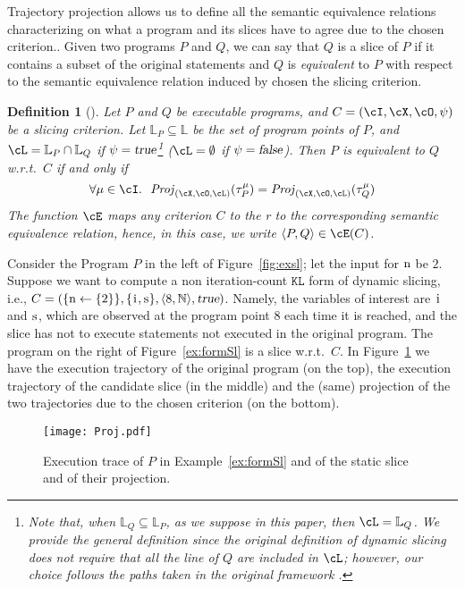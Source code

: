 \documentclass[prodmode,acmtocl]{acmsmall}
\def\prog{\ensuremath{P}\xspace}
\def\progq{\ensuremath{Q}\xspace}
\def\trace{\ensuremath{\tau}\xspace}
\def\memory{\ensuremath{\mu}\xspace}
\def\lnums{\ensuremath{\mathbb{L}}\xspace}
\def\crit{\ensuremath{C}\xspace}
\def\KL{\ensuremath{\mathtt{KL}}\xspace}
\def\Proj{\ensuremath{\mathit{Proj}}\xspace}
\newcommand{\la}{\leftarrow}
\newcommand{\false}{\mbox{\sl false}}
\newcommand{\true}{\mbox{\sl true}}
\def\tuple#1{\langle #1 \rangle}
\newcommand{\0}{\mbox{\bf 0}}
\newtheorem{mydefinition}[theorem]{Definition}
\newcommand{\CODE}[1]{\ensuremath{\mbox{\lstinline!#1!}\xspace}\xspace}
\def\ii{\CODE{i}}
\def\nn{\CODE{n}}
\def\ss{\CODE{s}}
\def\NATURALS{\mathbb{N}}
\begin{document}
Trajectory projection allows us to define all the semantic equivalence
relations characterizing on what a program and its slices have to agree due to the chosen criterion..  Given two programs $\prog$ and
$\progq$, we can say that $\progq$ is a slice of $\prog$ if it contains a subset of the original
statements and $\progq$ is \emph{equivalent} to $\prog$ with respect
to the semantic equivalence relation induced by chosen the slicing criterion.

\begin{mydefinition}[\cite{AForm}]
  \label{def:UnifiedEquivalence} Let $\prog$ and $\progq$ be
  executable programs, and $\crit=(\cI,\cX,\cO,\psi)$ be a slicing
  criterion.  Let $\lnums_\prog\subseteq\lnums$ be the set of program
  points of $\prog$, and $\cL=\lnums_\prog\cap\lnums_\progq$ if $\psi=\true$\footnote{Note that,
  when $\lnums_\progq \subseteq \lnums_\prog$, as we suppose in this paper, then $\cL=\lnums_\progq$.  We provide the general definition since
  the original definition of dynamic slicing \cite{KorelLaski}
  does not require that all the line of $\progq$ are included in
  $\cL$; however, our choice follows the paths taken in the original
  framework \cite{TheoFoun}.}
  ($\cL = \emptyset$ if $\psi=\false$).  Then $\prog$
  is \emph{equivalent} to $\progq$ w.r.t.\ $\crit$ if and only
  if \[ \forall\memory\in \cI.~~ \Proj_{(\cX, \cO, \cL)}(\trace_\prog^\memory)
  = \Proj_{(\cX,\cO,\cL)}(\trace_\progq^\memory)\] The function $\cE$ maps any criterion $\crit$ to the r
 to the corresponding semantic
  equivalence relation, hence, in this case, we write $\tuple{\prog,\progq}\in \cE(\crit)$.
\end{mydefinition}

\begin{example}
  \label{ex:formSl}
  Consider the Program $\prog$ in the left of
  Figure~\ref{fig:exsl}; let the input for \nn be $2$.
 \noindent
  Suppose we want to compute a non iteration-count $\KL$ form of
  dynamic slicing, i.e., $\crit=(\{\mbox{\nn}\la \{2\}\},\{\mbox{\ii},\mbox{\ss}\},\tuple{8,\NATURALS},\true)$. Namely, the variables of interest are
  \ii and \ss, which are observed at the program point $8$ each time it is reached, and
   the slice has not to execute statements not executed in the original program.  The program on the right of Figure~\ref{ex:formSl} is a slice w.r.t.\ $\crit$.
    In Figure~\ref{ExTrace} we have the execution trajectory of the original program (on the top), the execution trajectory of the candidate slice (in the middle) and the (same) projection of the two trajectories due to the chosen criterion (on the bottom).
  \begin{figure}
    \begin{center}
      \texttt{[image: Proj.pdf]}
    \end{center}
    \caption{Execution trace of $P$ in Example~\ref{ex:formSl} and of the static slice and of their projection.}\label{ExTrace}
  \end{figure}
\end{example}
\end{document}
